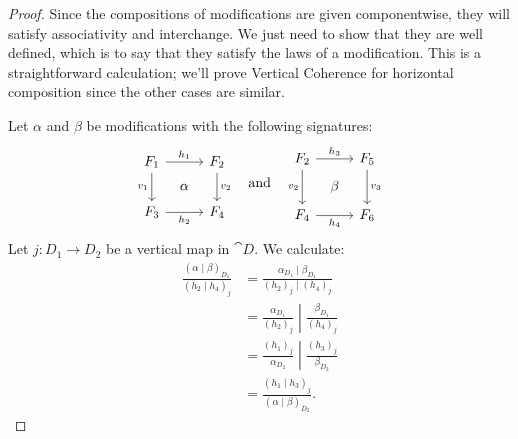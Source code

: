 \documentclass[DynamicalBook]{subfiles}
\begin{document}
\begin{proof}
  Since the compositions of modifications are given componentwise, they will
  satisfy associativity and interchange. We just need to show that they are well
  defined, which is to say that they satisfy the laws of a modification. This is
  a straightforward calculation; we'll prove Vertical Coherence for horizontal
  composition since the other cases are similar.

  Let $\alpha$ and $\beta$ be modifications with the following signatures:
  \[
        \begin{tikzcd}[sep=tiny]
          F_1 \ar[dd, "v_1"'] \ar[rr, "h_1"] & & F_2
 \ar[dd, "v_2"] \\
           & \alpha & \\
          F_3 \ar[rr, "h_2"'] & & F_4
        \end{tikzcd}
        \quad\mbox{and}\quad
        \begin{tikzcd}[sep=tiny]
          F_2 \ar[dd, "v_2"'] \ar[rr, "h_3"] & & F_5
 \ar[dd, "v_3"] \\
           & \beta & \\
          F_4 \ar[rr, "h_4"'] & & F_6
        \end{tikzcd}
\]
  Let $j : D_1 \to D_2$ be a vertical map in $\cat{D}$. We calculate:
  \begin{align*}
    \frac{(\alpha \mid \beta)_{D_1}}{(h_2 \mid h_4)_{j}} &= \frac{\alpha_{D_1} \mid \beta_{D_1}}{(h_2)_j \mid (h_4)_j} \\
                                                         &= \left. \frac{\alpha_{D_1}}{(h_2)_{j}} \middle| \frac{\beta_{D_1}}{(h_4)_{j}} \right. \\
                                                         &= \left. \frac{(h_1)_{j}}{\alpha_{D_2}} \middle| \frac{(h_3)_{j}}{\beta_{D_2}} \right. \\
                                                         &= \frac{(h_1 \mid h_3)_{j}}{(\alpha \mid \beta)_{D_2}}.
  \end{align*}
\end{proof}
\end{document}
